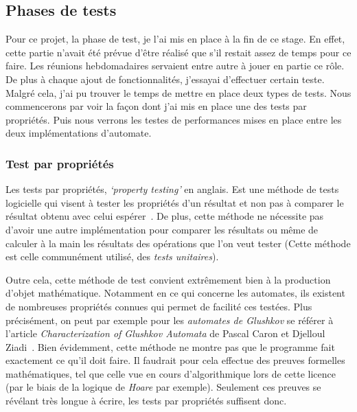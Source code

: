 \subsection{Phases de tests}

Pour ce projet, la phase de test, je l'ai mis en place à la fin de ce stage. En
effet, cette partie n'avait été prévue d'être réalisé que s'il restait assez de
temps pour ce faire. Les réunions hebdomadaires servaient entre autre à jouer en
partie ce rôle. De plus à chaque ajout de fonctionnalités, j'essayai d'effectuer
certain teste. Malgré cela, j'ai pu trouver le temps de mettre en place deux
types de tests. Nous commencerons par voir la façon dont j'ai mis en place une
des tests par propriétés. Puis nous verrons les testes de performances mises en
place entre les deux implémentations d'automate.

\subsubsection{Test par propriétés}

Les tests par propriétés, \textit{`property testing'} en anglais. Est une
méthode de tests logicielle qui visent à tester les propriétés d'un résultat et
non pas à comparer le résultat obtenu avec celui espérer~\cite{propertyTesting}.
De plus, cette méthode ne nécessite pas d'avoir une autre implémentation pour
comparer les résultats ou même de calculer à la main les résultats des
opérations que l'on veut tester (Cette méthode est celle communément utilisé,
des \textit{tests unitaires}).

\vphantom{}

Outre cela, cette méthode de test convient extrêmement bien à la production
d'objet mathématique. Notamment en ce qui concerne les automates, ils existent
de nombreuses propriétés connues qui permet de facilité ces testées. Plus
précisément, on peut par exemple pour les \textit{automates de Glushkov} se
référer à l'article \textit{Characterization of Glushkov Automata} de Pascal
Caron et Djelloul Ziadi~\cite{CaronZiadi2001}. Bien évidemment, cette méthode ne
montre pas que le programme fait exactement ce qu'il doit faire. Il faudrait
pour cela effectue des preuves formelles mathématiques, tel que celle vue en
cours d'algorithmique lors de cette licence (par le biais de la logique de
\textit{Hoare} par exemple). Seulement ces preuves se révélant très longue à
écrire, les tests par propriétés suffisent donc.

\vphantom{}

